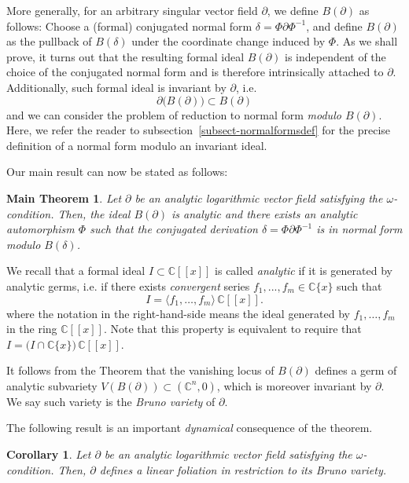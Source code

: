\documentclass[10pt,twoside,reqno]{amsart}
\newtheorem{corollary}[thm]{Corollary}
\newtheorem*{thmmain}{Main Theorem}
\theoremstyle{remark}
\theoremstyle{remark}
\newcommand{\C}{\mathbb{C}}
\begin{document}
More generally, for an arbitrary singular vector field \(\partial\), we define
\(B(\partial)\) as follows: Choose a (formal) conjugated normal form
\(\delta = \Phi \partial \Phi^{-1}\), and define \(B(\partial)\) as the pullback
of \(B(\delta)\) under the coordinate change induced by \(\Phi\). As we shall prove, it turns out
that the resulting formal ideal \(B(\partial)\) is independent of the choice of
the conjugated normal form and is therefore intrinsically attached to
\(\partial\). Additionally, such formal ideal is invariant by $\partial$, i.e. 
$$ \partial \big( B(\partial) \big ) \subset B(\partial)$$
and we can consider the problem of reduction to normal form {\em modulo $B(\partial)$}.  Here, we refer the reader to subsection~\ref{subsect-normalformsdef} for the precise definition of a normal form modulo an invariant ideal. 

Our main result can now be stated as follows:
\begin{thmmain}\label{thm:main}
		Let $\partial$ be an analytic logarithmic vector field satisfying the $\omega$-condition. Then, the ideal $B(\partial)$ is analytic and there exists an analytic automorphism $\Phi$ such that the conjugated derivation $\delta=\Phi\partial\Phi^{-1}$ is in normal form {\em modulo $B(\delta)$}. 
	\end{thmmain}
\noindent We recall that a formal ideal $I \subset \C[[x]]$ is called {\em analytic} if it is generated by analytic germs, i.e. if there exists {\em convergent} series $f_1,...,f_m \in \C\{x\}$ such that 
$$
I = \langle f_1, \ldots, f_{m} \rangle \, \mathbb{C}[[x]].
$$
where the notation in the right-hand-side means the ideal generated by $f_1, \ldots, f_{m}$ in the ring $\mathbb{C}[[x]]$. Note that this property is equivalent to require that $I = \big( I \cap \C\{x\} \big)\, \C[[x]]$. 

It follows from the Theorem that the vanishing locus of $B(\partial)$ defines a germ of analytic subvariety $V(B(\partial)) \subset (\C^n,0)$, which is moreover invariant by $\partial$. We say such variety is the \emph{Bruno variety} of $\partial$.

The following result is an important {\em dynamical} consequence of the theorem.
    \begin{corollary}\label{cor:lienarfoliation}
        Let $\partial$ be an analytic logarithmic vector field satisfying the $\omega$-condition. Then, $\partial$ defines a linear foliation in restriction to its Bruno variety.
    \end{corollary}
\end{document}

